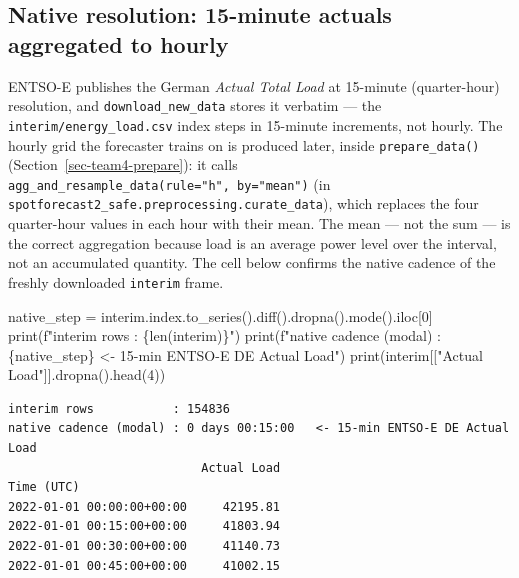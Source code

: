 \documentclass[
  english,
  letterpaper,
]{scrbook}
\newenvironment{Shaded}{\begin{snugshade}}{\end{snugshade}}
\newcommand{\BuiltInTok}[1]{\textcolor[rgb]{0.00,0.23,0.31}{#1}}
\newcommand{\DecValTok}[1]{\textcolor[rgb]{0.68,0.00,0.00}{#1}}
\newcommand{\NormalTok}[1]{\textcolor[rgb]{0.00,0.23,0.31}{#1}}
\newcommand{\OperatorTok}[1]{\textcolor[rgb]{0.37,0.37,0.37}{#1}}
\newcommand{\SpecialCharTok}[1]{\textcolor[rgb]{0.37,0.37,0.37}{#1}}
\newcommand{\SpecialStringTok}[1]{\textcolor[rgb]{0.13,0.47,0.30}{#1}}
\newcommand{\StringTok}[1]{\textcolor[rgb]{0.13,0.47,0.30}{#1}}
\begin{document}
\subsection{Native resolution: 15-minute actuals aggregated to
hourly}\label{native-resolution-15-minute-actuals-aggregated-to-hourly}

ENTSO-E publishes the German \emph{Actual Total Load} at 15-minute
(quarter-hour) resolution, and \texttt{download\_new\_data} stores it
verbatim --- the \texttt{interim/energy\_load.csv} index steps in
15-minute increments, not hourly. The hourly grid the forecaster trains
on is produced later, inside \texttt{prepare\_data()}
(Section~\ref{sec-team4-prepare}): it calls
\texttt{agg\_and\_resample\_data(rule="h",\ by="mean")} (in
\texttt{spotforecast2\_safe.preprocessing.curate\_data}), which replaces
the four quarter-hour values in each hour with their mean. The mean ---
not the sum --- is the correct aggregation because load is an average
power level over the interval, not an accumulated quantity. The cell
below confirms the native cadence of the freshly downloaded
\texttt{interim} frame.

\protect{}\label{team4-native-resolution}
\begin{Shaded}
\begin{Highlighting}[]
\NormalTok{native\_step }\OperatorTok{=}\NormalTok{ interim.index.to\_series().diff().dropna().mode().iloc[}\DecValTok{0}\NormalTok{]}
\BuiltInTok{print}\NormalTok{(}\SpecialStringTok{f"interim rows           : }\SpecialCharTok{\{}\BuiltInTok{len}\NormalTok{(interim)}\SpecialCharTok{\}}\SpecialStringTok{"}\NormalTok{)}
\BuiltInTok{print}\NormalTok{(}\SpecialStringTok{f"native cadence (modal) : }\SpecialCharTok{\{}\NormalTok{native\_step}\SpecialCharTok{\}}\SpecialStringTok{   \textless{}{-} 15{-}min ENTSO{-}E DE Actual Load"}\NormalTok{)}
\BuiltInTok{print}\NormalTok{(interim[[}\StringTok{"Actual Load"}\NormalTok{]].dropna().head(}\DecValTok{4}\NormalTok{))}
\end{Highlighting}
\end{Shaded}

\begin{verbatim}
interim rows           : 154836
native cadence (modal) : 0 days 00:15:00   <- 15-min ENTSO-E DE Actual Load
                           Actual Load
Time (UTC)                            
2022-01-01 00:00:00+00:00     42195.81
2022-01-01 00:15:00+00:00     41803.94
2022-01-01 00:30:00+00:00     41140.73
2022-01-01 00:45:00+00:00     41002.15
\end{verbatim}
\end{document}
